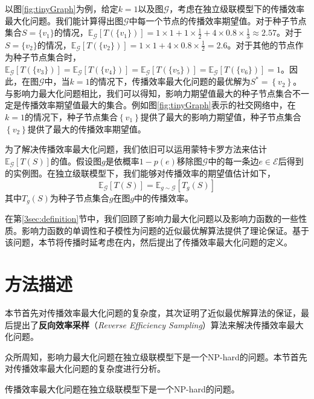 以图\ref{fig:tinyGraph}为例，给定$k=1$以及图$\mathcal{G}$，考虑在独立级联模型下的传播效率最大化问题。我们能计算得出图$\mathcal{G}$中每一个节点的传播效率期望值。对于种子节点集合$S=\{v_1\}$的情况，$\mathbb{E}_\mathcal{G}\left[T\left(\{v_1\}\right)\right] = 1\times1 + 1\times\frac{1}{2} + 4\times0.8\times\frac{1}{3}\approx2.57$。对于$S=\{v_2\}$的情况，$\mathbb{E}_\mathcal{G}\left[T\left(\{v_2\}\right)\right] = 1\times1 + 4\times0.8\times\frac{1}{2} = 2.6$。对于其他的节点作为种子节点集合时，$\mathbb{E}_\mathcal{G}\left[T\left(\{v_3\}\right)\right] = \mathbb{E}_\mathcal{G}\left[T\left(\{v_4\}\right)\right] = \mathbb{E}_\mathcal{G}\left[T\left(\{v_5\}\right)\right] = \mathbb{E}_\mathcal{G}\left[T\left(\{v_6\}\right)\right] = 1$。因此，在图$\mathcal{G}$中，当$k=1$的情况下，传播效率最大化问题的最优解为$S^\ast = \left\{v_2\right\}$。与影响力最大化问题相比，我们可以得知，影响力期望值最大的种子节点集合不一定是传播效率期望值最大的集合。例如图\ref{fig:tinyGraph}表示的社交网络中，在$k=1$的情况下，种子节点集合$\left\{v_1\right\}$提供了最大的影响力期望值，种子节点集合$\left\{v_2\right\}$提供了最大的传播效率期望值。

为了解决传播效率最大化问题，我们依旧可以运用蒙特卡罗方法来估计$\mathbb{E}_\mathcal{G}\left[T\left(S\right)\right]$的值。假设图$g$是依概率$1-p\left(e\right)$移除图$\mathcal{G}$中的每一条边$e\in\mathcal{E}$后得到的实例图。在独立级联模型下，我们能够对传播效率的期望值估计如下，
\begin{equation}\label{eq:expectedIE}
    \mathbb{E}_\mathcal{G}\left[T\left(S\right)\right] = \mathbb{E}_{g\sim\mathcal{G}}\left[T_g\left(S\right)\right]
\end{equation}
其中$T_g\left(S\right)$为种子节点集合$g$在图$g$中的传播效率。

在第\ref{3sec:definition}节中，我们回顾了影响力最大化问题以及影响力函数的一些性质。影响力函数的单调性和子模性为问题的近似最优解算法提供了理论保证。基于该问题，本节将传播时延考虑在内，然后提出了传播效率最大化问题的定义。
\section{方法描述}
\label{3sec:method}
本节首先对传播效率最大化问题的复杂度，其次证明了近似最优解算法的保证，最后提出了\textbf{反向效率采样}（\textit{Reverse Efficiency Sampling}）算法来解决传播效率最大化问题。

众所周知，影响力最大化问题在独立级联模型下是一个NP-hard的问题。本节首先对传播效率最大化问题的复杂度进行分析。

\begin{mytheo}\label{theo:npHard}
传播效率最大化问题在独立级联模型下是一个NP-hard的问题。
\end{mytheo}

